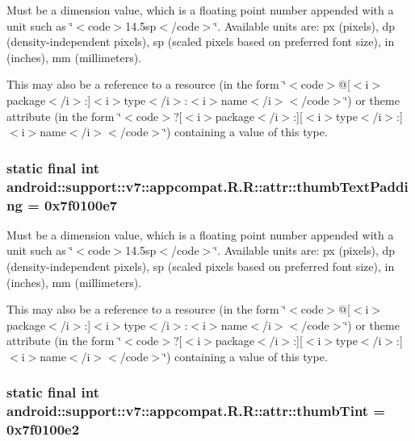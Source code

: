 Must be a dimension value, which is a floating point number appended with a unit such as \char`\"{}$<$code$>$14.5sp$<$/code$>$\char`\"{}. Available units are: px (pixels), dp (density-independent pixels), sp (scaled pixels based on preferred font size), in (inches), mm (millimeters). 

This may also be a reference to a resource (in the form \char`\"{}$<$code$>$@\mbox{[}$<$i$>$package$<$/i$>$:\mbox{]}$<$i$>$type$<$/i$>$:$<$i$>$name$<$/i$>$$<$/code$>$\char`\"{}) or theme attribute (in the form \char`\"{}$<$code$>$?\mbox{[}$<$i$>$package$<$/i$>$:\mbox{]}\mbox{[}$<$i$>$type$<$/i$>$:\mbox{]}$<$i$>$name$<$/i$>$$<$/code$>$\char`\"{}) containing a value of this type. \hypertarget{classandroid_1_1support_1_1v7_1_1appcompat_1_1_r_1_1attr_4a13e6b3e39cf30ae1328174f4962761}{
\subsubsection[{thumbTextPadding}]{\setlength{\rightskip}{0pt plus 5cm}static final int android::support::v7::appcompat.R.R::attr::thumbTextPadding = 0x7f0100e7}}
\label{classandroid_1_1support_1_1v7_1_1appcompat_1_1_r_1_1attr_4a13e6b3e39cf30ae1328174f4962761}


Must be a dimension value, which is a floating point number appended with a unit such as \char`\"{}$<$code$>$14.5sp$<$/code$>$\char`\"{}. Available units are: px (pixels), dp (density-independent pixels), sp (scaled pixels based on preferred font size), in (inches), mm (millimeters). 

This may also be a reference to a resource (in the form \char`\"{}$<$code$>$@\mbox{[}$<$i$>$package$<$/i$>$:\mbox{]}$<$i$>$type$<$/i$>$:$<$i$>$name$<$/i$>$$<$/code$>$\char`\"{}) or theme attribute (in the form \char`\"{}$<$code$>$?\mbox{[}$<$i$>$package$<$/i$>$:\mbox{]}\mbox{[}$<$i$>$type$<$/i$>$:\mbox{]}$<$i$>$name$<$/i$>$$<$/code$>$\char`\"{}) containing a value of this type. \hypertarget{classandroid_1_1support_1_1v7_1_1appcompat_1_1_r_1_1attr_44933ee552fa399abbcbe4d21c436b9e}{
\subsubsection[{thumbTint}]{\setlength{\rightskip}{0pt plus 5cm}static final int android::support::v7::appcompat.R.R::attr::thumbTint = 0x7f0100e2}}
\label{classandroid_1_1support_1_1v7_1_1appcompat_1_1_r_1_1attr_44933ee552fa399abbcbe4d21c436b9e}


